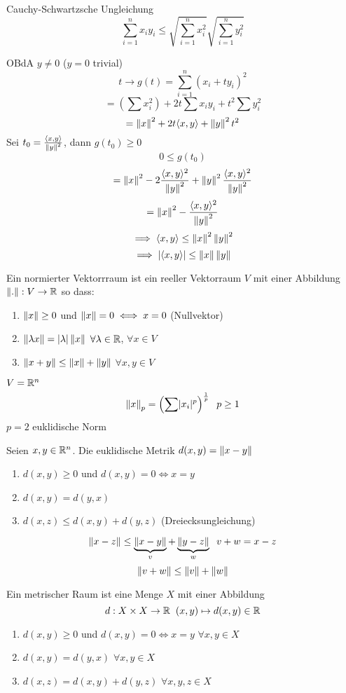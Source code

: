 \begin{Sat}{Cauchy-Schwartzsche Ungleichung}
  \[\sum^n_{i=1}x_iy_i\leq\sqrt{\sum_{i=1}^nx_i^2}\sqrt{\sum_{i=1}^ny_i^2}\]
\end{Sat}
\begin{Bew}
  OBdA $y\neq 0$ ($y=0$ trivial)
  \[t\to g(t)=\sum_{i=1}^n(x_i+ty_i)^2\]
  \[=\left( \sum x_i^2 \right)+2t\sum x_iy_i+t^2\sum y_i^2\]
  \[=\left\| x \right\|^2+2t\langle x,y \rangle+\left\| y \right\|^2t^2\]
  Sei $t_0=\frac{\langle x,y \rangle}{\left\| y \right\|^2}$, dann $g(t_0)\geq 0$
  \[0\leq g(t_0)\]
  \[=\left\| x \right\|^2-2\frac{\langle x,y \rangle^2}{\left\| y \right\|^2}+\left\| y \right\|^2\frac{\langle x,y \rangle^2}{\left\| y \right\|^2}\]
  \[=\left\| x \right\|^2-\frac{\langle x,y \rangle^2}{\left\| y \right\|^2}\]
  \[\implies \langle x,y \rangle\leq\left\| x \right\|^2\left\| y \right\|^2\]
  \[\implies \mathopen| \langle x,y \rangle \mathclose|\leq\left\| x \right\|\left\| y \right\|\]
\end{Bew}
\begin{Def}
  Ein normierter Vektorrraum ist ein reeller Vektorraum $V$ mit einer Abbildung $\left\| . \right\| :V\to\mathbb{R}$ so dass:
  \begin{enumerate}
    \item $\left\| x \right\|\geq 0$ und $\left\| x \right\|=0\iff x=0$ (Nullvektor)
    \item $\left\| \lambda x \right\|=\mathopen| \lambda \mathclose|\left\| x \right\|$ $\forall \lambda\in\mathbb{R}$, $\forall x\in V$
    \item $\left\| x+y \right\|\leq\left\| x \right\|+\left\| y \right\|$ $\forall x,y\in V$
  \end{enumerate}
\end{Def}
\begin{Bsp}
  $V=\mathbb{R}^n$
  \[\left\| x \right\|_p=\left(\sum\mathopen| x_i \mathclose|^p\right)^{\frac{1}{p}}\hspace{2mm} p\geq 1\]
  $p=2$ euklidische Norm
\end{Bsp}
\begin{Def}
  Seien $x,y\in\mathbb{R}^n$. Die euklidische Metrik $d(x,y)=\left\| x-y \right\|$
\end{Def}
\begin{Lem}
  \begin{enumerate}
    \item $d(x,y)\geq 0$ und $d(x,y)=0\iff x=y$
    \item $d(x,y)=d(y,x)$
    \item $d(x,z)\leq d(x,y)+d(y,z)$ (Dreiecksungleichung)
  \end{enumerate}
\end{Lem}
\begin{Bew}
  \[\left\| x-z \right\|\leq\underbrace{\left\| x-y \right\|}_v+\underbrace{\left\| y-z \right\|}_w\hspace{2mm} v+w=x-z\]
  \[\left\| v+w \right\|\leq\left\| v \right\|+\left\| w \right\|\]
\end{Bew}
\begin{Def}
  Ein metrischer Raum ist eine Menge $X$ mit einer Abbildung
  \[d:X\times X\to\mathbb{R}\hspace{2mm} (x,y)\mapsto d(x,y)\in\mathbb{R}\]
  \begin{enumerate}
    \item $d(x,y)\geq 0$ und $d(x,y)=0\iff x=y$ $\forall x,y\in X$
    \item $d(x,y)=d(y,x)$ $\forall x,y\in X$
    \item $d(x,z)=d(x,y)+d(y,z)$ $\forall x,y,z\in X$
  \end{enumerate}
\end{Def}
